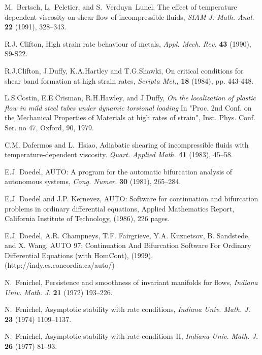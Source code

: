 \documentclass[11pt]{article}
\theoremstyle{remark}
\begin{document}
\begin{thebibliography}{10}

{\sc M.~Bertsch, L.~Peletier, and S.~Verduyn~Lunel},
The effect of temperature dependent viscosity on shear flow of  incompressible fluids,
{\it SIAM J. Math. Anal.} {\bf 22 } (1991), 328--343.

{\sc R.J. Clifton},  High strain rate behaviour of metals,
{\it Appl. Mech. Rev.}
{\bf 43} (1990), S9-S22.

{\sc R.J.Clifton, J.Duffy, K.A.Hartley and T.G.Shawki},
{ On critical conditions for shear band formation at high strain rates}, {\it Scripta Met.}, {\bf 18} (1984), pp. 443-448.

{\sc L.S.Costin, E.E.Crisman, R.H.Hawley, and J.Duffy},
{\sl On the localization of plastic flow in mild steel tubes under dynamic torsional loading}
 In "Proc. 2nd Conf. on the Mechanical Properties of Materials at high rates of strain",
 Inst. Phys. Conf. Ser. no 47, Oxford, 90, 1979.

{\sc C.M. Dafermos and L.~Hsiao},
Adiabatic shearing of incompressible fluids with temperature-dependent viscosity.
{\it Quart.  Applied Math.} {\bf 41} (1983), 45--58.


{\sc E.J. Doedel}, AUTO: A program for the automatic bifurcation analysis of autonomous systems, {\it Cong. Numer.} {\bf 30} (1981), 265--284.

{\sc E.J. Doedel and J.P. Kernevez}, AUTO: Software for continuation and bifurcation problems in ordinary differential equations, Applied Mathematics Report, California Institute of Technology, (1986), 226 pages.

{\sc E.J. Doedel, A.R. Champneys,  T.F. Fairgrieve, Y.A. Kuznetsov, B. Sandstede, and X. Wang}, AUTO 97: Continuation And Bifurcation Software For Ordinary Differential Equations (with HomCont), (1999), (http://indy.cs.concordia.ca/auto/)


{\sc N.~Fenichel},
Persistence and smoothness of invariant manifolds for  flows,
{\it Indiana Univ. Math. J.} {\bf 21} (1972) 193--226.

{\sc N.~Fenichel},
Asymptotic stability with rate conditions,
{\it Indiana Univ. Math. J.} {\bf 23} (1974) 1109--1137.

{\sc N.~Fenichel},
Asymptotic stability with rate conditions \textrm{II},
{\it Indiana Univ. Math. J.} {\bf 26} (1977) 81--93.


\end{thebibliography}
\end{document}

